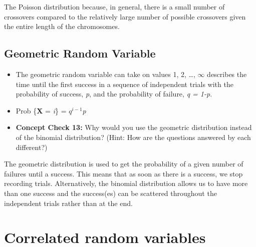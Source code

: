 \documentclass[12pt]{report}
\begin{document}
\color{red} The Poisson distribution because, in general, there is a small number of crossovers compared to the relatively large number of possible crossovers given the entire length of the chromosomes. 

\color{black}

\bigskip

\subsection{Geometric Random Variable}

\begin{itemize}

\item The geometric random variable can take on values 1, 2, \ldots, $\infty$ describes the time until the first success in a sequence of independent trials with the probability of success, \textit{p}, and the probability of failure, \textit{q = 1-p}. 

\item Prob \{\textbf{X} = \textit{i}\} = \textit{$q^{i-1}$}\textit{p}

\item \textbf{Concept Check 13:} Why would you use the geometric distribution instead of the binomial distribution? (Hint: How are the questions answered by each different?) 

\end{itemize}

\color{red} The geometric distribution is used to get the probability of a given number of failures until a success. This means that as soon as there is a success, we stop recording trials. Alternatively, the binomial distribution allows us to have more than one success and the success(es) can be scattered throughout the independent trials rather than at the end. 

\color{black}

\bigskip

\section{Correlated random variables}
\end{document}
